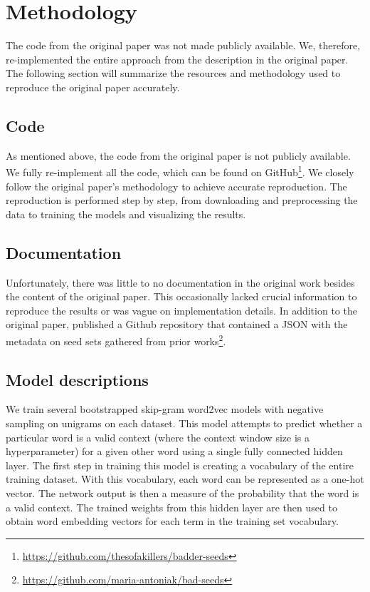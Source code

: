\section{Methodology}

The code from the original paper was not made publicly available. We, therefore, re-implemented the
entire approach from the description in the original paper. The following section will summarize the
resources and methodology used to reproduce the original paper accurately.

\subsection{Code}

As mentioned above, the code from the original paper is not publicly available. We fully
re-implement all the code, which can be found on
GitHub\footnote{\href{https://github.com/thesofakillers/badder-seeds}{https://github.com/thesofakillers/badder-seeds}}.
We closely follow the original paper's methodology to achieve accurate reproduction. The
reproduction is performed step by step, from downloading and preprocessing the data to training the
models and visualizing the results.

\subsection{Documentation}

Unfortunately, there was little to no documentation in the original work besides the content of the
original paper. This occasionally lacked crucial information to reproduce the results or was vague
on implementation details. In addition to the original paper, \citet{antoniak-mimno-2021-bad}
published a Github repository that contained a JSON with the metadata on seed sets gathered from
prior
works\footnote{\label{footnote:badseedsrepo}\href{https://github.com/maria-antoniak/bad-seeds}{https://github.com/maria-antoniak/bad-seeds}}.

\subsection{Model descriptions}

We train several bootstrapped skip-gram word2vec models with negative sampling on unigrams on each
dataset. This model attempts to predict whether a particular word is a valid context (where the
context window size is a hyperparameter) for a given other word using a single fully connected
hidden layer. The first step in training this model is creating a vocabulary of the entire training
dataset. With this vocabulary, each word can be represented as a one-hot vector. The network output
is then a measure of the probability that the word is a valid context. The trained weights from this
hidden layer are then used to obtain word embedding vectors for each term in the training set
vocabulary.

